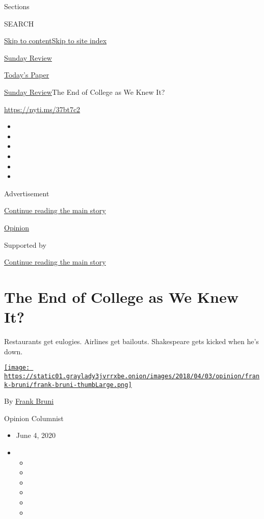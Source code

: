 Sections

SEARCH

\protect\hyperlink{site-content}{Skip to
content}\protect\hyperlink{site-index}{Skip to site index}

\href{https://www.nytimes3xbfgragh.onion/section/opinion/sunday}{Sunday
Review}

\href{https://myaccount.nytimes3xbfgragh.onion/auth/login?response_type=cookie\&client_id=vi}{}

\href{https://www.nytimes3xbfgragh.onion/section/todayspaper}{Today's
Paper}

\href{/section/opinion/sunday}{Sunday Review}\textbar{}The End of
College as We Knew It?

\url{https://nyti.ms/37bt7c2}

\begin{itemize}
\item
\item
\item
\item
\item
\item
\end{itemize}

Advertisement

\protect\hyperlink{after-top}{Continue reading the main story}

\href{/section/opinion}{Opinion}

Supported by

\protect\hyperlink{after-sponsor}{Continue reading the main story}

\hypertarget{the-end-of-college-as-we-knew-it}{%
\section{The End of College as We Knew
It?}\label{the-end-of-college-as-we-knew-it}}

Restaurants get eulogies. Airlines get bailouts. Shakespeare gets kicked
when he's down.

\href{https://www.nytimes3xbfgragh.onion/by/frank-bruni}{\texttt{[image: https://static01.graylady3jvrrxbe.onion/images/2018/04/03/opinion/frank-bruni/frank-bruni-thumbLarge.png]}}

By \href{https://www.nytimes3xbfgragh.onion/by/frank-bruni}{Frank Bruni}

Opinion Columnist

\begin{itemize}
\item
  June 4, 2020
\item
  \begin{itemize}
  \item
  \item
  \item
  \item
  \item
  \item
  \end{itemize}
\end{itemize}


